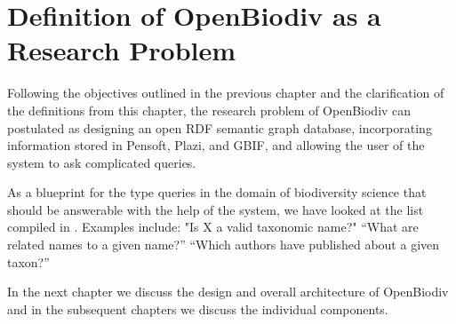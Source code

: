 \section{Definition of OpenBiodiv as a Research Problem}

Following the objectives outlined in the previous chapter and the clarification of the definitions from this chapter, the research problem of OpenBiodiv can postulated as designing an open RDF semantic graph database, incorporating information stored in Pensoft, Plazi, and GBIF, and allowing the user of the system to ask complicated queries. 

As a blueprint for the type queries in the domain of biodiversity science that should be answerable with the help of the system, we have looked at the list compiled in \cite{pro-ibiosphere_competency_2013}. Examples include: "Is X a valid taxonomic name?" ``What are related names to a given name?'' ``Which authors have published about a given taxon?''

In the next chapter we discuss the design and overall architecture of OpenBiodiv and in the subsequent chapters we discuss the individual components.